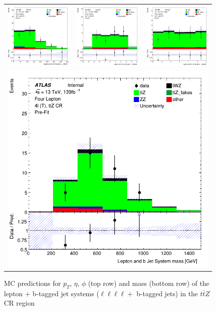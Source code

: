 \begin{figure}[htbp]
\centering
  \begin{tabular}{ccc}

    \includegraphics[width=.2\textwidth]{figures/PreFitPlots/lep4_ttZ_4T_bJets_Leps_sys_pt}&
    \includegraphics[width=.2\textwidth]{figures/PreFitPlots/lep4_ttZ_4T_bJets_Leps_sys_eta} &
    \includegraphics[width=.2\textwidth]{figures/PreFitPlots/lep4_ttZ_4T_bJets_Leps_sys_phi} \\
    \multicolumn{3}{c}{\includegraphics[width=.2\textwidth]{figures/PreFitPlots/lep4_ttZ_4T_bJets_Leps_sys_mass}}

  \end{tabular}
    \caption{MC predictions for $p_{T}$, $\eta$, $\phi$ (top row) and mass (bottom row) of the lepton $+$ b-tagged jet systems ($\ell \ell \ell \ell + $ b-tagged jets) in the $t\bar{t}Z$ CR region }
  \label{fig:4lep-ttZ-CR-bjet-and-leps-sys-Plots}
\end{figure}

